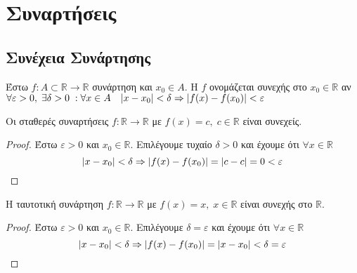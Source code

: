 \documentclass[a4paper,table]{report}
\begin{document}
\setcounter{chapter}{3}


\chapter{Συναρτήσεις}

\section{Συνέχεια Συνάρτησης}

\begin{dfn}
  Έστω $ f \colon A \subset \mathbb{R} \to \mathbb{R} $ συνάρτηση και $ x_{0} \in A $. 
  Η $f$ ονομάζεται συνεχής στο $ x_{0} \in \mathbb{R} $ αν $ \forall \varepsilon >0, 
  \; \exists \delta >0 \; : \forall x \in A \quad \abs{x- x_{0}} < \delta 
  \Rightarrow \abs{f(x) - f(x_{0})} < \varepsilon $
\end{dfn}

\begin{prop}
  Οι σταθερές συναρτήσεις $ f \colon \mathbb{R} \to \mathbb{R} $ με $ f(x)=c, \; c \in 
  \mathbb{R}$ είναι συνεχείς.
\end{prop}
\begin{proof}
\item {}
  Έστω $ \varepsilon >0 $ και $ x_{0} \in \mathbb{R} $. 
  Επιλέγουμε τυχαίο $ \delta >0 $ και έχουμε ότι $ \forall x \in \mathbb{R} $ 
  \[
    \abs{x- x_{0}} < \delta \Rightarrow \abs{f(x)- f(x_{0})} = \abs{c-c} = 0 < 
    \varepsilon 
  \]
\end{proof}

\begin{prop}
  Η ταυτοτική συνάρτηση $ f \colon \mathbb{R} \to \mathbb{R} $ με $ f(x)=x, \; x \in 
  \mathbb{R}$ είναι συνεχής στο $ \mathbb{R} $.
\end{prop}
\begin{proof}
\item {}
  Έστω $ \varepsilon >0 $ και $ x_{0} \in \mathbb{R} $. 
  Επιλέγουμε $ \delta = \varepsilon $ και έχουμε ότι $ \forall x \in \mathbb{R} $ 
  \[
    \abs{x- x_{0}} < \delta \Rightarrow \abs{f(x)-f(x_{0})} = \abs{x- x_{0}} < 
    \delta = \varepsilon
  \]
\end{proof}
\end{document}

